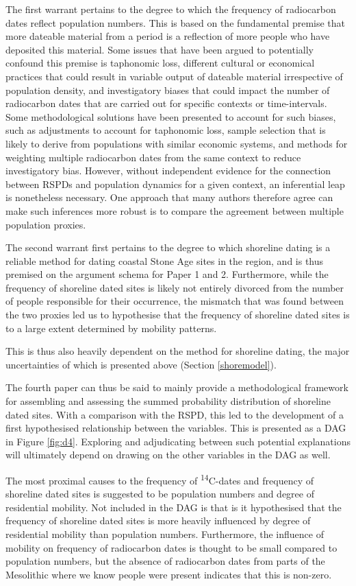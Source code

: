 \documentclass[
  12pt,
  a4paper,
  oneside]{book}
\begin{document}
The first warrant pertains to the degree to which the frequency of radiocarbon dates reflect population numbers. This is based on the fundamental premise that more dateable material from a period is a reflection of more people who have deposited this material. Some issues that have been argued to potentially confound this premise is taphonomic loss, different cultural or economical practices that could result in variable output of dateable material irrespective of population density, and investigatory biases that could impact the number of radiocarbon dates that are carried out for specific contexts or time-intervals. Some methodological solutions have been presented to account for such biases, such as adjustments to account for taphonomic loss, sample selection that is likely to derive from populations with similar economic systems, and methods for weighting multiple radiocarbon dates from the same context to reduce investigatory bias. However, without independent evidence for the connection between RSPDs and population dynamics for a given context, an inferential leap is nonetheless necessary. One approach that many authors therefore agree can make such inferences more robust is to compare the agreement between multiple population proxies.

The second warrant first pertains to the degree to which shoreline dating is a reliable method for dating coastal Stone Age sites in the region, and is thus premised on the argument schema for Paper 1 and 2. Furthermore, while the frequency of shoreline dated sites is likely not entirely divorced from the number of people responsible for their occurrence, the mismatch that was found between the two proxies led us to hypothesise that the frequency of shoreline dated sites is to a large extent determined by mobility patterns.

This is thus also heavily dependent on the method for shoreline dating, the major uncertainties of which is presented above (Section \ref{shoremodel}).

The fourth paper can thus be said to mainly provide a methodological framework for assembling and assessing the summed probability distribution of shoreline dated sites. With a comparison with the RSPD, this led to the development of a first hypothesised relationship between the variables. This is presented as a DAG in Figure \ref{fig:d4}. Exploring and adjudicating between such potential explanations will ultimately depend on drawing on the other variables in the DAG as well.

The most proximal causes to the frequency of \textsuperscript{14}C-dates and frequency of shoreline dated sites is suggested to be population numbers and degree of residential mobility. Not included in the DAG is that is it hypothesised that the frequency of shoreline dated sites is more heavily influenced by degree of residential mobility than population numbers. Furthermore, the influence of mobility on frequency of radiocarbon dates is thought to be small compared to population numbers, but the absence of radiocarbon dates from parts of the Mesolithic where we know people were present indicates that this is non-zero.
\end{document}
